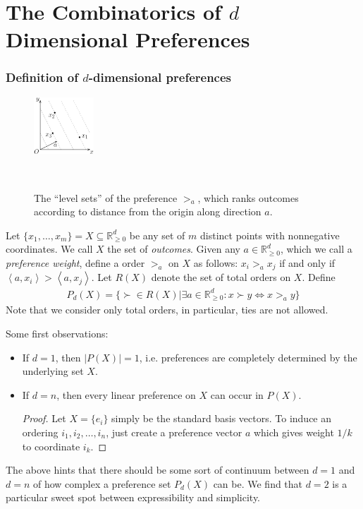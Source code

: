 \documentclass[12pt]{article}
\newcommand{\Rgz}{\mathbb{R}_{\ge 0}}
\newcommand{\ip}[2]{\left\langle{#1},{#2}\right\rangle}
\newcommand{\1}[1]{\mathds{1}[{#1}]}
\begin{document}
\part{The Combinatorics of $d$ Dimensional Preferences}

\section{Definition of $d$-dimensional preferences}
  \begin{figure}
    \vspace{-0.7in}
    \begin{center}
      \includegraphics[width=0.2\textwidth]{figures/def2DPref}
    \end{center}
    \ \caption{
      The ``level sets'' of the preference $>_a$,
      which ranks outcomes according to distance from the origin along
      direction $a$.
    }
  \end{figure}
  Let $\{x_1,\ldots,x_m\} = X\subseteq \Rgz^d$ be any set of
  $m$ distinct points with nonnegative coordinates.
  We call $X$ the set of \emph{outcomes}.
  Given any $a\in \Rgz^d$, which we call a \emph{preference weight},
  define a order $>_a$ on $X$ as follows:
  $x_i >_a x_j$ if and only if $\ip{a}{x_i} > \ip{a}{x_j}$.
  Let $R(X)$ denote the set of total orders on $X$.
  Define
  \begin{align*}
    P_d(X) = \{ \succ \in R(X) | \exists a\in\Rgz^d: x \succ y \iff x >_a y\}
  \end{align*}
  Note that we consider only total orders, in particular,
  ties are not allowed.

  Some first observations:
  \begin{itemize}
    \item If $d=1$, then $|P(X)| = 1$, i.e. preferences are completely
      determined by the underlying set $X$.
    \item If $d=n$, then every linear preference on $X$ can occur in $P(X)$.
      \begin{proof}
        Let $X = \{e_i\}$ simply be the standard basis vectors.
        To induce an ordering $i_1, i_2, \ldots, i_n$, just create a preference
        vector $a$ which gives weight $1/k$ to coordinate $i_k$.
      \end{proof}
  \end{itemize}
  The above hints that there should be some sort of continuum between $d=1$
  and $d=n$ of how complex a preference set $P_d(X)$ can be.
  We find that $d=2$ is a particular sweet spot between expressibility and
  simplicity.
\end{document}
